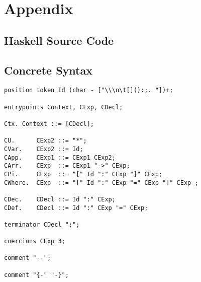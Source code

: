 \documentclass{article}
\theoremstyle{remark}
\begin{document}
\clearpage




\clearpage

\appendix
\section{Appendix} 
\subsection{Haskell Source Code} \label{apdix:source-code}
\subsection{Concrete Syntax} \label{apdix:concrete-syntax}
\begin{verbatim}
position token Id (char - ["\\\n\t[]():;. "])+;

entrypoints Context, CExp, CDecl;

Ctx. Context ::= [CDecl];

CU.      CExp2 ::= "*";
CVar.    CExp2 ::= Id;
CApp.    CExp1 ::= CExp1 CExp2;
CArr.    CExp  ::= CExp1 "->" CExp;
CPi.     CExp  ::= "[" Id ":" CExp "]" CExp;
CWhere.  CExp  ::= "[" Id ":" CExp "=" CExp "]" CExp ;

CDec.    CDecl ::= Id ":" CExp;
CDef.    CDecl ::= Id ":" CExp "=" CExp;

terminator CDecl ";";

coercions CExp 3;

comment "--";

comment "{-" "-}";
\end{verbatim}
\end{document}
